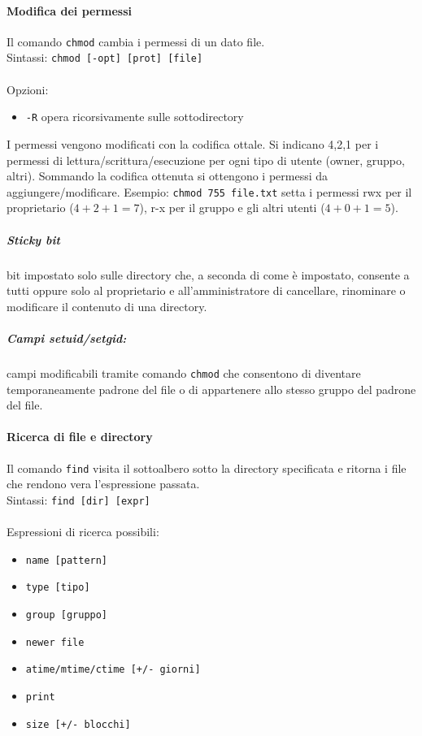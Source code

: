 \documentclass[a4paper]{article}
\begin{document}
\paragraph{Modifica dei permessi} Il comando \verb|chmod| cambia i permessi di un dato file.\\
Sintassi:
\verb|chmod [-opt] [prot] [file]| \\ \\
Opzioni:
\begin{itemize}
\item \verb|-R| opera ricorsivamente sulle sottodirectory
\end{itemize}
I permessi vengono modificati con la codifica ottale. Si indicano 4,2,1 per i permessi di lettura/scrittura/esecuzione per ogni tipo di utente (owner, gruppo, altri).
Sommando la codifica ottenuta si ottengono i permessi da aggiungere/modificare.
Esempio: \verb|chmod 755 file.txt| setta i permessi rwx per il proprietario ($4+2+1=7$), r-x per il gruppo e gli altri utenti ($4+0+1=5$).

\subparagraph{Sticky bit} bit impostato solo sulle directory che, a seconda di come è impostato, consente a tutti oppure solo al proprietario e all'amministratore di cancellare, rinominare o modificare il contenuto di una directory.

\subparagraph{Campi setuid/setgid:} campi modificabili tramite comando \verb|chmod| che consentono di diventare temporaneamente padrone del file o di appartenere allo stesso gruppo del padrone del file.

\paragraph{Ricerca di file e directory} Il comando \verb|find| visita il sottoalbero sotto la directory specificata e ritorna i file che rendono vera l'espressione passata. \\
Sintassi: \verb|find [dir] [expr]|\\ \\
Espressioni di ricerca possibili:
\begin{itemize}
\item \verb|name [pattern]|
\item \verb|type [tipo]|
\item \verb|group [gruppo]|
\item \verb|newer file|
\item \verb|atime/mtime/ctime [+/- giorni]|
\item \verb|print|
\item \verb|size [+/- blocchi]|
\end{itemize}
\end{document}
